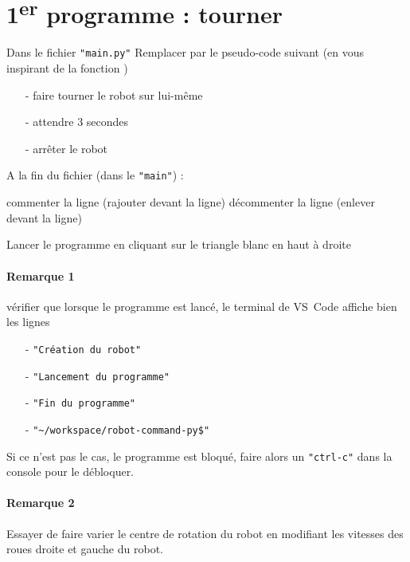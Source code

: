 \documentclass{report}
\begin{document}
\section{1\textsuperscript{er} programme : tourner}

\begin{itemize}
\step Dans le fichier \texttt{"main.py"}
\step Remplacer  par le pseudo-code suivant (en vous inspirant de la fonction )
\begin{itemize}
    \item[-] faire tourner le robot sur lui-même
    \item[-] attendre 3 secondes
    \item[-] arrêter le robot
\end{itemize}
\step A la fin du fichier (dans le \texttt{"main"}) :
\begin{itemize}
    \step commenter la ligne  (rajouter \code{\#} devant la ligne)
    \step décommenter la ligne  (enlever \code{\#} devant la ligne)
\end{itemize}
\step Lancer le programme en cliquant sur le triangle blanc  en haut à droite
\end{itemize}

\paragraph{Remarque 1}
vérifier que lorsque le programme est lancé, le terminal de VS~Code affiche bien les lignes
\begin{itemize}
\item[-] \texttt{"Création du robot"}
\item[-] \texttt{"Lancement du programme"}
\item[-] \texttt{"Fin du programme"}
\item[-] \texttt{"\textasciitilde/workspace/robot-command-py\$"}
\end{itemize}
Si ce n'est pas le cas, le programme est bloqué, faire alors un \texttt{"ctrl-c"} dans la console pour le débloquer.

\paragraph{Remarque 2}
Essayer de faire varier le centre de rotation du robot en modifiant les vitesses des roues droite et gauche du robot.
\end{document}
